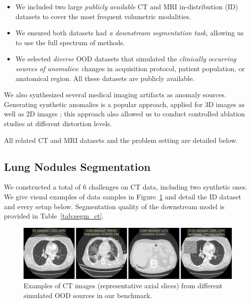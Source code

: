 \begin{itemize}
	
	\item We included two large \textit{publicly available} CT and MRI in-distribution (ID) datasets to cover the most frequent volumetric modalities.
	
	\item We ensured both datasets had \textit{a downstream segmentation task}, allowing us to use the full spectrum of methods.
	
	\item We selected \textit{diverse} OOD datasets that simulated the \textit{clinically occurring sources of anomalies}: changes in acquisition protocol, patient population, or anatomical region. All these datasets are publicly available.
	
\end{itemize}

We also synthesized several medical imaging artifacts as anomaly sources. Generating synthetic anomalies is a popular approach, applied for 3D images \cite{david_zimmerer_2022_6362313,lambert2022improving} as well as 2D images \cite{hendrycks2016baseline,basart2022scaling}; this approach also allowed us to conduct controlled ablation studies at different distortion levels.

All related CT and MRI datasets and the problem setting are detailed below.


\subsection{Lung Nodules Segmentation}

We constructed a total of 6 challenges on CT data, including two synthetic ones. We give visual examples of data samples in Figure~\ref{fig:ct} and detail the ID dataset and every setup below. Segmentation quality of the downstream model is provided in Table~\ref{tab:segm_ct}.

\begin{figure}[h]
	\centering
	\includegraphics[width=\textwidth]{Dissertation/Figures/5_ood_bench/ct_examples_2.pdf}
	\caption{Examples of CT images (representative axial slices) from different simulated OOD sources in our benchmark.}
	\label{fig:ct}
\end{figure}

